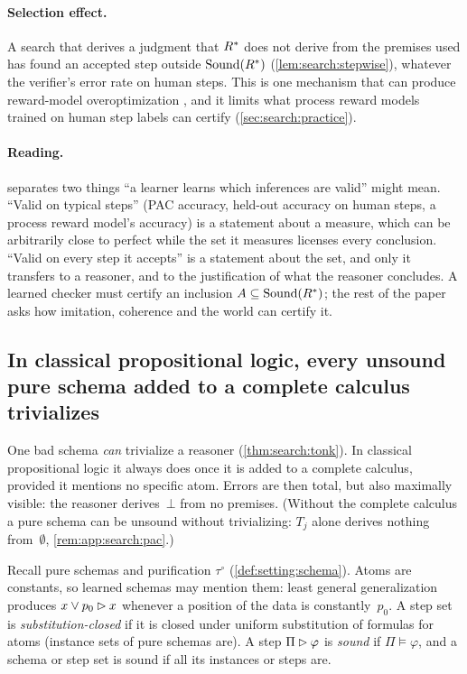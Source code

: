 \paragraph{Selection effect.}
A search that derives a judgment that $R^{*}$ does not derive from the premises used has found an accepted step outside $\mathrm{Sound}(R^{*})$ (\cref{lem:search:stepwise}), whatever the verifier's error rate on human steps. This is one mechanism that can produce reward-model overoptimization \citep{gao2023scaling}, and it limits what process reward models trained on human step labels \citep{lightman2023verify} can certify (\cref{sec:search:practice}).

\paragraph{Reading.}
 separates two things ``a learner learns which inferences are valid'' might mean. ``Valid on typical steps'' (PAC accuracy, held-out accuracy on human steps, a process reward model's accuracy) is a statement about a measure, which can be arbitrarily close to perfect while the set it measures licenses every conclusion. ``Valid on every step it accepts'' is a statement about the set, and only it transfers to a reasoner, and to the justification of what the reasoner concludes. A learned checker must certify an inclusion $A\subseteq\mathrm{Sound}(R^{*})$; the rest of the paper asks how imitation, coherence and the world can certify it.

\subsection{In classical propositional logic, every unsound pure schema added to a complete calculus trivializes}\label{sec:search:post}

One bad schema \emph{can} trivialize a reasoner (\cref{thm:search:tonk}). In classical propositional logic it always does once it is added to a complete calculus, provided it mentions no specific atom. Errors are then total, but also maximally visible: the reasoner derives~$\bot$ from no premises. (Without the complete calculus a pure schema can be unsound without trivializing: $T_j$ alone derives nothing from~$\emptyset$, \cref{rem:app:search:pac}.)

\begin{definition}\label{def:search:pure}
Recall pure schemas and purification $\tau^\circ$ (\cref{def:setting:schema}). Atoms are constants, so learned schemas may mention them: least general generalization produces $x\vee p_0\rhd x$ whenever a position of the data is constantly~$p_0$. A step set is \emph{substitution-closed} if it is closed under uniform substitution of formulas for atoms (instance sets of pure schemas are). A step $\Pi\rhd\varphi$ is \emph{sound} if $\Pi\models\varphi$, and a schema or step set is sound if all its instances or steps are.
\end{definition}

